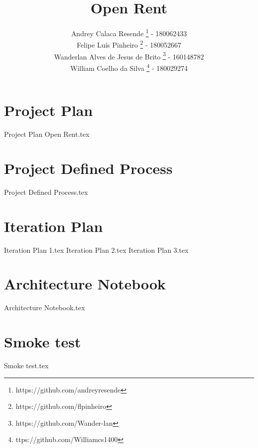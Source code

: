 \documentclass[a4paper,11pt]{book}
\title{Open Rent}
\author{
    Andrey Calaca Resende \footnote{https://github.com/andreyresende} - 180062433\\
    Felipe Luís Pinheiro \footnote{https://github.com/flpinheiro} - 180052667 \\
    Wanderlan Alves de Jesus de Brito \footnote{https://github.com/Wander-lan} - 160148782\\
    William Coelho da Silva \footnote{ttps://github.com/Williamcs1400} - 180029274

}
\date{}
\begin{document}
\maketitle

\tableofcontents

\chapter{Project Plan}
{Project Plan Open Rent.tex}

\chapter{Project Defined Process}
{Project Defined Process.tex}

\chapter{Iteration Plan}
{Iteration Plan 1.tex}
{Iteration Plan 2.tex}
{Iteration Plan 3.tex}

\chapter{Architecture Notebook}
{Architecture Notebook.tex}

\chapter{Smoke test}
{Smoke test.tex}
\end{document}

